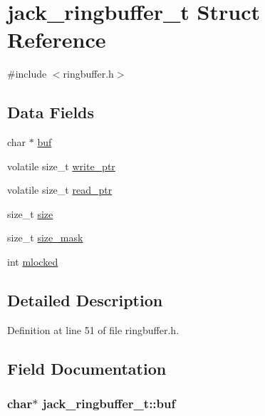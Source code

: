 \hypertarget{structjack__ringbuffer__t}{\section{jack\-\_\-ringbuffer\-\_\-t \-Struct \-Reference}
\label{df/d9b/structjack__ringbuffer__t}
}


{\ttfamily \#include $<$ringbuffer.\-h$>$}

\subsection*{\-Data \-Fields}
\begin{DoxyCompactItemize}
\item 
char $\ast$ \hyperlink{structjack__ringbuffer__t_ac39622c7f150768b0428204ed58fe65c}{buf}
\item 
volatile size\-\_\-t \hyperlink{structjack__ringbuffer__t_a7ba69e5aa3fdde2f4e4421e50c10b737}{write\-\_\-ptr}
\item 
volatile size\-\_\-t \hyperlink{structjack__ringbuffer__t_a0bb413093ec1e3c3e957ddaa42ddf512}{read\-\_\-ptr}
\item 
size\-\_\-t \hyperlink{structjack__ringbuffer__t_ae0db038d5d6566e916f64166cfe60317}{size}
\item 
size\-\_\-t \hyperlink{structjack__ringbuffer__t_aa782cb7bf8312c7a04180685820b5ddd}{size\-\_\-mask}
\item 
int \hyperlink{structjack__ringbuffer__t_ac33041ce67d9996804cba45d613018dc}{mlocked}
\end{DoxyCompactItemize}


\subsection{\-Detailed \-Description}


\-Definition at line 51 of file ringbuffer.\-h.



\subsection{\-Field \-Documentation}
\hypertarget{structjack__ringbuffer__t_ac39622c7f150768b0428204ed58fe65c}{
\subsubsection[{buf}]{\setlength{\rightskip}{0pt plus 5cm}char$\ast$ {\bf jack\-\_\-ringbuffer\-\_\-t\-::buf}}}\label{df/d9b/structjack__ringbuffer__t_ac39622c7f150768b0428204ed58fe65c}


